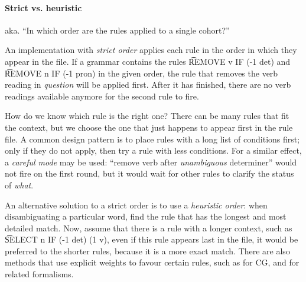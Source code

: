 \paragraph{Strict vs. heuristic}

aka. ``In which order are the rules applied to a single cohort?''

An implementation with \emph{strict order} applies each rule in the order in 
which they appear in the file. If a grammar contains the rules \t{REMOVE v IF (-1 det)} and \t{REMOVE n IF (-1 pron)} in the given order, the rule that removes the verb reading in \emph{question} will be applied first. After it has finished, there are no verb readings available anymore for the second rule to fire.
					
How do we know which rule is the right one? There can be many rules that fit the context, but we choose the one that just happens to appear first in the rule file. 
A common design pattern is to place rules with a long list of conditions first; 
only if they do not apply, then try a rule with less conditions. For a similar effect,
a \emph{careful mode} may be used: ``remove verb after \emph{unambiguous} determiner'' 
would not fire on the first round, but it would wait for other rules to clarify the
status of \emph{what}.


					
An alternative solution to a strict order is to use a \emph{heuristic order}: when disambiguating a particular word, find the rule that has the longest and most detailed match. Now, assume that there is a rule with a longer context, such as \t{SELECT n IF (-1 det) (1 v)}, even if this rule appears last in the file, it would be preferred to the shorter rules, because it is a more exact match.
There are also methods that use explicit weights to favour certain rules, such as \cite{pirinen2015} for CG, and \cite{voutilainen1994designing,oflazer97votingconstraints,silfverberg2009conflict} for related formalisms. 
					
